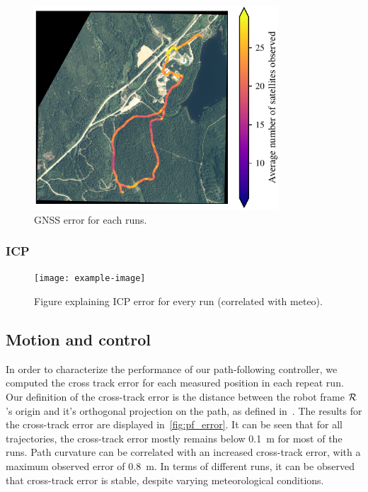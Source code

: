 \begin{figure}
	\centering
	\includegraphics[height=3.0in]{./figs/GPS/GNSS_numsatimg.pdf}
	\caption{GNSS error for each runs.}
	\label{fig:gnss_run_error}
\end{figure}


\subsubsection{ICP}
\label{sec:ICP}

\lightlipsum[1]

\begin{figure} [htpb]
	\centering
	\texttt{[image: example-image]}
	\caption{Figure explaining ICP error for every run (correlated with meteo).}
	\label{fig:icp_error}
\end{figure}



\subsection{Motion and control}
\label{sec:res_motion}

In order to characterize the performance of our path-following controller, we computed the cross track error for each measured position in each repeat run.
Our definition of the cross-track error is the distance between the robot frame $\mathcal{R}$'s origin and it's orthogonal projection on the path, as defined in~\citep{Mondoloni2005}.
The results for the cross-track error are displayed in~\autoref{fig:pf_error}.
It can be seen that for all trajectories, the cross-track error mostly remains below \SI{0.1}{m} for most of the runs.
Path curvature can be correlated with an increased cross-track error, with a maximum observed error of \SI{0.8}{m}.
In terms of different runs, it can be observed that cross-track error is stable, despite varying meteorological conditions. 

